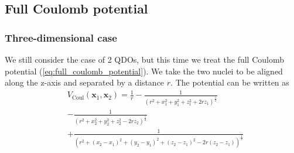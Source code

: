 \documentclass[reprint, amsmath, amssymb, aps]{revtex4-2}
\begin{document}
        \subsection{Full Coulomb potential}

            \subsubsection{Three-dimensional case}

                We still consider the case of 2 QDOs, but this time we treat the full Coulomb potential (\ref{eq:full_coulomb_potential}). We take the two nuclei to be aligned along the z-axis and separated by a distance $r$. The potential can be written as
                \begin{equation}
                \begin{split}
                    &V_\text{Coul}(\bm{x} _1, \bm{x} _2) = \frac{1}{r} - \frac{1}{\left(r^2 + x_1^2+y_1^2+z_1^2+2rz_1\right)^{\frac{1}{2}}} \\
                    &- \frac{1}{\left(r^2 + x_2^2+y_2^2+z_2^2-2rz_2\right)^{\frac{1}{2}}} \\
                    &+\frac{1}{\left(r^2 + (x_2-x_1)^2+(y_2-y_1)^2+(z_2-z_1)^2-2r(z_2-z_1)\right)^{\frac{1}{2}}}
                \end{split}
                \end{equation}
\end{document}
